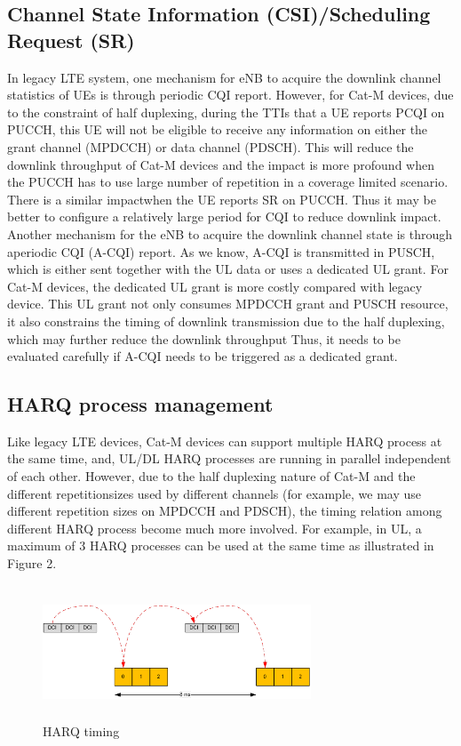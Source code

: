 \documentclass[conference,compsoc]{IEEEtran}
\begin{document}
\subsection{Channel State Information (CSI)/Scheduling Request (SR)}
In legacy LTE system, one mechanism for eNB to acquire the downlink channel statistics of UEs is through periodic CQI report. However, for Cat-M devices, due to the constraint of half duplexing, during the TTIs that a UE reports PCQI on PUCCH, this UE will not be eligible to receive any information on either the grant channel (MPDCCH) or data channel (PDSCH). This will reduce the downlink throughput of Cat-M devices and the impact is more profound when the PUCCH has to use large number of repetition in a coverage limited scenario. There is a similar impactwhen the UE reports SR on PUCCH. Thus it may be better to configure a relatively large period for CQI to reduce downlink impact.  Another mechanism for the eNB to acquire the downlink channel state is through aperiodic CQI (A-CQI) report. As we know, A-CQI is transmitted in PUSCH, which is either sent together with the UL data or uses a dedicated UL grant. For Cat-M devices, the dedicated UL grant is more costly compared with legacy device. This UL grant not only consumes MPDCCH grant  and PUSCH resource, it also constrains  the timing of downlink transmission due to the half duplexing, which may further reduce the downlink throughput Thus, it needs to be evaluated carefully if A-CQI needs to be triggered as a dedicated grant.

\subsection{HARQ process management}
Like legacy LTE devices, Cat-M devices can support multiple HARQ process at the same time, and, UL/DL HARQ processes are running in parallel independent of each other. However, due to the half duplexing nature of Cat-M and the different repetitionsizes  used by different channels (for example, we may use different repetition sizes on MPDCCH and PDSCH), the timing relation among different HARQ process become much more involved. For example, in UL, a maximum of 3 HARQ processes can be used at the same time as illustrated in Figure 2.

\begin{figure}[htbp]
\centerline{\includegraphics[height=40mm,width=80mm]{harq_timing.png}}
\caption{HARQ timing}
\label{fig_harq_timing}
\end{figure}
\end{document}
